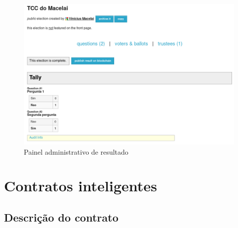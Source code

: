 \documentclass{ufsctex/ufsctex}
\begin{document}
\begin{figure}[H]
	\centering
	\includegraphics[width=\linewidth]{helios-2}
	\caption{Painel administrativo de resultado}
	\label{fig:helios-2}
\end{figure}



\section{Contratos inteligentes}

\subsection{Descrição do contrato}
\end{document}
